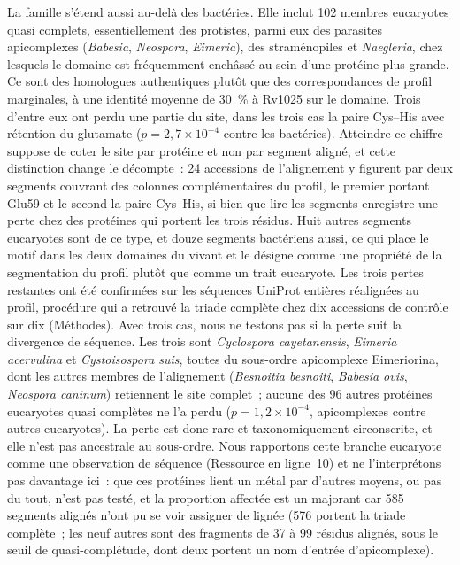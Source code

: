 \documentclass[11pt,a4paper]{article}
\begin{document}
La famille s'étend aussi au-delà des bactéries. Elle inclut 102 membres eucaryotes quasi complets, essentiellement des protistes, parmi eux des parasites apicomplexes (\textit{Babesia}, \textit{Neospora}, \textit{Eimeria}), des straménopiles et \textit{Naegleria}, chez lesquels le domaine est fréquemment enchâssé au sein d'une protéine plus grande. Ce sont des homologues authentiques plutôt que des correspondances de profil marginales, à une identité moyenne de 30~\% à Rv1025 sur le domaine. Trois d'entre eux ont perdu une partie du site, dans les trois cas la paire Cys--His avec rétention du glutamate ($p=2,7\times10^{-4}$ contre les bactéries). Atteindre ce chiffre suppose de coter le site par protéine et non par segment aligné, et cette distinction change le décompte~: 24 accessions de l'alignement y figurent par deux segments couvrant des colonnes complémentaires du profil, le premier portant Glu59 et le second la paire Cys--His, si bien que lire les segments enregistre une perte chez des protéines qui portent les trois résidus. Huit autres segments eucaryotes sont de ce type, et douze segments bactériens aussi, ce qui place le motif dans les deux domaines du vivant et le désigne comme une propriété de la segmentation du profil plutôt que comme un trait eucaryote. Les trois pertes restantes ont été confirmées sur les séquences UniProt entières réalignées au profil, procédure qui a retrouvé la triade complète chez dix accessions de contrôle sur dix (Méthodes). Avec trois cas, nous ne testons pas si la perte suit la divergence de séquence. Les trois sont \textit{Cyclospora cayetanensis}, \textit{Eimeria acervulina} et \textit{Cystoisospora suis}, toutes du sous-ordre apicomplexe Eimeriorina, dont les autres membres de l'alignement (\textit{Besnoitia besnoiti}, \textit{Babesia ovis}, \textit{Neospora caninum}) retiennent le site complet~; aucune des 96 autres protéines eucaryotes quasi complètes ne l'a perdu ($p=1,2\times10^{-4}$, apicomplexes contre autres eucaryotes). La perte est donc rare et taxonomiquement circonscrite, et elle n'est pas ancestrale au sous-ordre. Nous rapportons cette branche eucaryote comme une observation de séquence (Ressource en ligne~10) et ne l'interprétons pas davantage ici~: que ces protéines lient un métal par d'autres moyens, ou pas du tout, n'est pas testé, et la proportion affectée est un majorant car 585 segments alignés n'ont pu se voir assigner de lignée (576 portent la triade complète~; les neuf autres sont des fragments de 37 à 99 résidus alignés, sous le seuil de quasi-complétude, dont deux portent un nom d'entrée d'apicomplexe).
\end{document}
